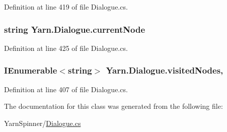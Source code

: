 Definition at line 419 of file Dialogue.\-cs.

\hypertarget{a00088_af368b5c342d585dc6953876c5965ccc8}{
\subsubsection[{current\-Node}]{\setlength{\rightskip}{0pt plus 5cm}string Yarn.\-Dialogue.\-current\-Node\hspace{0.3cm}{\ttfamily [get]}}}\label{a00088_af368b5c342d585dc6953876c5965ccc8}


Definition at line 425 of file Dialogue.\-cs.

\hypertarget{a00088_ac5661051e0b7f44527fe526c7766dbbf}{
\subsubsection[{visited\-Nodes}]{\setlength{\rightskip}{0pt plus 5cm}I\-Enumerable$<$string$>$ Yarn.\-Dialogue.\-visited\-Nodes\hspace{0.3cm}{\ttfamily [get]}, {\ttfamily [set]}}}\label{a00088_ac5661051e0b7f44527fe526c7766dbbf}


Definition at line 407 of file Dialogue.\-cs.



The documentation for this class was generated from the following file\-:\begin{DoxyCompactItemize}
\item 
Yarn\-Spinner/\hyperlink{a00282}{Dialogue.\-cs}\end{DoxyCompactItemize}
